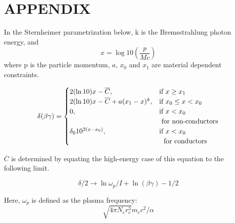\documentclass[a4paper, 12pt, conference]
{ieeeconf}      %
\begin{document}









\newpage

\section*{APPENDIX}

In the Sternheimer parametrization below, k is the Bremsstrahlung photon energy, and $$x = \log{10}(\frac{p}{Mc})$$ where p is the particle momentum, $a$, $x_0$ and $x_1$ are material dependent constraints.

\[
\delta (\beta \gamma) = 
\begin{cases}
2(\ln{10})x - \overline{C}, & \text{if } x \geq x_1 \\
2(\ln{10})x - \overline{C} + a(x_1 - x)^k, & \text{if } x_0 \leq x < x_0 \\
0, & \text{if } x < x_0 \\ & \text{\small{ for non-conductors}} \\
\delta_0 10^{2(x - x_0)}, & \text{if } x < x_0 \\ & \text{ \small{ for conductors}}
\end{cases}
\]

$\overline{C}$ is determined by equating the high-energy case of this equation to the following limit.

\begin{equation*}
\delta/2   \to \ln {\omega_p / I} + \ln{(\beta \gamma)} - 1/2
\end{equation*}

Here, $\omega_p$ is defined as the plasma frequency: $$ \sqrt{4\pi N_e r_e^3} m_e c^2 / \alpha $$
\end{document}
